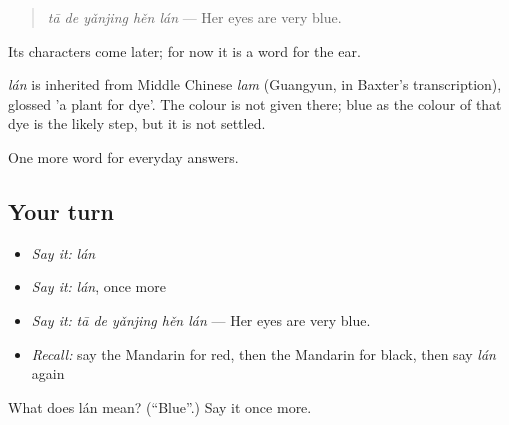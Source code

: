 \begin{quote}
\emph{tā de yǎnjing hěn lán} — Her eyes are very blue.
\end{quote}

Its characters come later; for now it is a word for the ear.

\begin{cousinweb}
\emph{lán} is inherited from Middle Chinese \emph{lam} (Guangyun, in Baxter's transcription), glossed 'a plant for dye'. The colour is not given there; blue as the colour of that dye is the likely step, but it is not settled.
\end{cousinweb}

\begin{grammarlens}[title={What you've built}]
One more word for everyday answers.
\end{grammarlens}

\subsection*{Your turn}
\begin{itemize}
\raggedright
  \item \emph{Say it:} \emph{lán}
  \item \emph{Say it:} \emph{lán}, once more
  \item \emph{Say it:} \emph{tā de yǎnjing hěn lán} — Her eyes are very blue.
  \item \emph{Recall:} say the Mandarin for red, then the Mandarin for black, then say \emph{lán} again
\end{itemize}

\begin{tcolorbox}[breakable,colback=teal!4,colframe=teal!35!black,title={Before you move on}]
What does lán mean? (\textquotedblleft{}Blue\textquotedblright{}.) Say it once more.
\end{tcolorbox}

